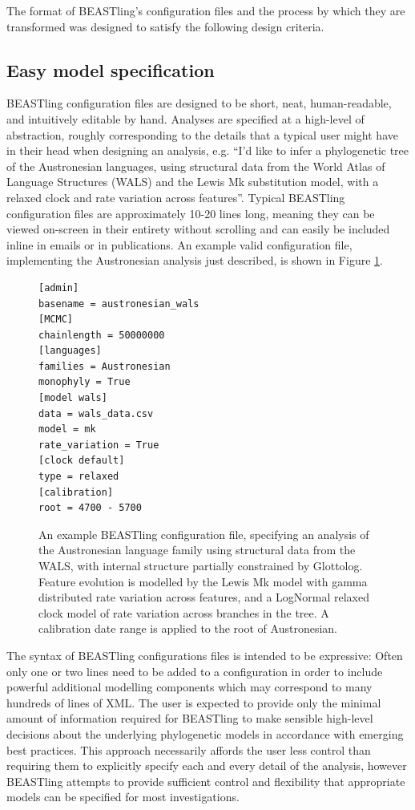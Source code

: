 \documentclass[10pt,a4paper]{article}
\begin{document}
The format of BEASTling's configuration files and the process by which they are transformed was designed to satisfy the following design criteria.

\subsection{Easy model specification}

BEASTling configuration files are designed to be short, neat, human-readable, and intuitively editable by hand.  Analyses are specified at a high-level of abstraction, roughly corresponding to the details that a typical user might have in their head when designing an analysis, e.g. ``I'd like to infer a phylogenetic tree of the Austronesian languages, using structural data from the World Atlas of Language Structures\cite{Dryer2013} (WALS) and the Lewis Mk substitution model\cite{Lewis2001}, with a relaxed clock and rate variation across features''.  Typical BEASTling configuration files are approximately 10-20 lines long, meaning they can be viewed on-screen in their entirety without scrolling and can easily be included inline in emails or in publications.  An example valid configuration file, implementing the Austronesian analysis just described, is shown in Figure \ref{fig:config}.

\begin{figure}[t]
	\begin{verbatim}[admin]
basename = austronesian_wals
[MCMC]
chainlength = 50000000
[languages]
families = Austronesian
monophyly = True
[model wals]
data = wals_data.csv
model = mk
rate_variation = True
[clock default]
type = relaxed
[calibration]
root = 4700 - 5700\end{verbatim}
\caption{An example BEASTling configuration file, specifying an analysis of the Austronesian language family using structural data from the WALS, with internal structure partially constrained by Glottolog. Feature evolution is modelled by the Lewis Mk model with gamma distributed rate variation across features, and a LogNormal relaxed clock model of rate variation across branches in the tree.  A calibration date range is applied to the root of Austronesian.}
\label{fig:config}
\end{figure}

The syntax of BEASTling configurations files is intended to be expressive:  Often only one or two lines need to be added to a configuration in order to include powerful additional modelling components which may correspond to many hundreds of lines of XML.  The user is expected to provide only the minimal amount of information required for BEASTling to make sensible high-level decisions about the underlying phylogenetic models in accordance with emerging best practices.  This approach necessarily affords the user less control than requiring them to explicitly specify each and every detail of the analysis, however BEASTling attempts to provide sufficient control and flexibility that appropriate models can be specified for most investigations.
\end{document}
